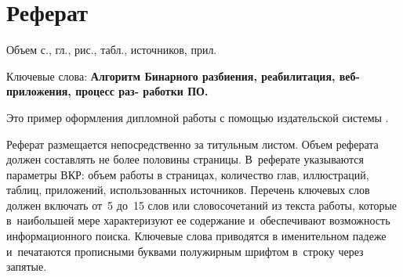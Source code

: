 \documentclass[a4paper,12pt]{diplom}
\begin{document}










\maketitle
\chapter*{Реферат}

Объем  с.,  гл.,  рис.,
 табл.,  источников,  прил.

\medskip

Ключевые слова: \textbf{Алгоритм Бинарного разбиения, реабилитация, веб-приложения, процесс раз-
работки ПО.}

\medskip

Это пример оформления дипломной работы с помощью издательской системы \LaTeXe.

Реферат размещается непосредственно за титульным листом. Объем реферата должен составлять не более половины страницы. В~реферате указываются параметры ВКР: объем работы в страницах, количество глав, иллюстраций, таблиц, приложений, использованных источников. Перечень ключевых слов должен включать от~5 до~15 слов или словосочетаний из текста работы, которые в~наибольшей мере характеризуют ее содержание и~обеспечивают возможность информационного поиска. Ключевые слова приводятся в именительном падеже и~печатаются прописными буквами полужирным шрифтом в~строку через запятые.
\end{document}
